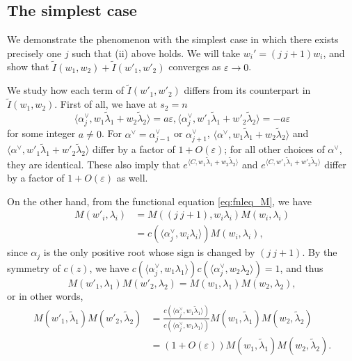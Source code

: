 \documentclass[11pt]{amsart}
\numberwithin{theorem}{section}
\numberwithin{equation}{section}
\theoremstyle{remark}
\theoremstyle{definition}
\begin{document}
{\subsection{The simplest case}

We demonstrate the phenomenon with the simplest case in which there exists precisely one $j$ such that (ii) above holds. We will take $w_i' = (j \ j+1) w_i$, and show that $\tilde I(w_1,w_2) + \tilde I(w'_1,w'_2)$ converges as $\varepsilon \rightarrow 0$.

We study how each term of $\tilde I(w'_1,w'_2)$ differs from its counterpart in $\tilde I(w_1,w_2)$. First of all, we have at $s_2=n$
\begin{equation*}
\langle \alpha^\vee_j,w_1\tilde\lambda_1+w_2\tilde\lambda_2\rangle= a\varepsilon,
\langle \alpha^\vee_j,w'_1\tilde\lambda_1+w'_2\tilde\lambda_2\rangle= -a\varepsilon
\end{equation*}
for some integer $a \neq 0$. For $\alpha^\vee = \alpha^\vee_{j-1}$ or $\alpha^\vee_{j+1}$, $\langle \alpha^\vee,w_1\tilde\lambda_1+w_2\tilde\lambda_2\rangle$ and $\langle \alpha^\vee,w'_1\tilde\lambda_1+w'_2\tilde\lambda_2\rangle$ differ by a factor of $1+O(\varepsilon)$; for all other choices of $\alpha^\vee$, they are identical. These also imply that $e^{\langle C,w_1\tilde\lambda_1+w_2\tilde\lambda_2\rangle}$ and $e^{\langle C,w'_1\tilde\lambda_1+w'_2\tilde\lambda_2\rangle}$ differ by a factor of $1+O(\varepsilon)$ as well.

On the other hand, from the functional equation \eqref{eq:fnleq_M}, we have
\begin{align*}
M(w'_i,\lambda_i) &= M((j \ j+1),w_i\lambda_i)M(w_i,\lambda_i) \\
&= c(\langle \alpha^\vee_j, w_i\lambda_i\rangle)M(w_i,\lambda_i),
\end{align*}
since $\alpha_j$ is the only positive root whose sign is changed by $(j \ j+1)$. By the symmetry of $c(z)$, we have $c(\langle \alpha^\vee_j, w_1\lambda_1\rangle) c(\langle \alpha^\vee_j, w_2\lambda_2\rangle) = 1$, and thus 
\begin{equation*}
M(w'_1,\lambda_1)M(w'_2,\lambda_2) = M(w_1,\lambda_1)M(w_2,\lambda_2),
\end{equation*}
or in other words,
\begin{align*}
M(w'_1,\tilde\lambda_1)M(w'_2,\tilde\lambda_2) &= \frac{c(\langle \alpha^\vee_j, w_1\tilde\lambda_1\rangle)}{c(\langle \alpha^\vee_j, w_1\lambda_1\rangle)}
M(w_1,\tilde\lambda_1)M(w_2,\tilde\lambda_2) \\
&= (1+O(\varepsilon))M(w_1,\tilde\lambda_1)M(w_2,\tilde\lambda_2).
\end{align*}

}
\end{document}
